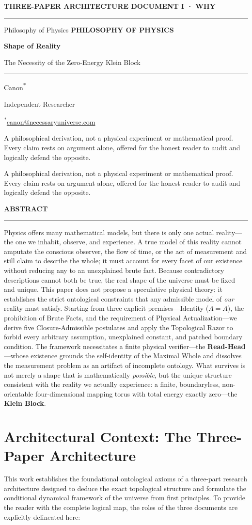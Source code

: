 \documentclass[11pt]{article}
\makeatletter
\theoremstyle{canonstyle}
\newcommand{\CanonTitlePage}{%
\begin{titlepage}
\thispagestyle{titlepage}
\vspace*{0.62cm}
{\sffamily\footnotesize\bfseries\color{seriesMuted}
THREE-PAPER ARCHITECTURE \hfill \CanonStage\par}
\vspace{0.42cm}
{\color{seriesAccent}\rule{\textwidth}{1.05pt}}\par
\vspace{1.65cm}
\ifx\CanonGenre\empty\else
{\sffamily\footnotesize\bfseries\color{seriesMuted}\MakeUppercase{\CanonGenre}}\par
\vspace{0.45cm}\fi
{\sffamily\bfseries\fontsize{28}{32}\selectfont\color{seriesInk}\hyphenpenalty=10000\exhyphenpenalty=10000\CanonTitle\par}
\vspace{0.52cm}
{\sffamily\large\color{seriesAccent}\CanonSubtitle\par}
\vspace{0.78cm}
{\color{seriesAccent}\rule{0.24\textwidth}{0.9pt}}\par
\vspace{0.95cm}
{\normalsize\sffamily Canon\textsuperscript{*}\;\orcidlink{0009-0001-9037-6209}\par}
\vspace{0.25cm}
{\small\sffamily\color{seriesMuted}Independent Researcher\par}
\vspace{0.16cm}
{\small\sffamily\color{seriesMuted}\textsuperscript{*}\href{mailto:canon@necessaryuniverse.com}{canon@necessaryuniverse.com}\par}
\vfill
\ifx\CanonDeck\empty\else
\begin{tcolorbox}[
  enhanced,
  colback=seriesPaper,
  colframe=seriesRule,
  boxrule=0.45pt,
  leftrule=2.4pt,
  arc=1.5pt,
  left=11pt,right=11pt,top=9pt,bottom=9pt,
  width=0.94\textwidth
]
\small\sffamily\color{seriesMuted}
\CanonDeck
\end{tcolorbox}
\vspace{0.65cm}
\fi

\end{titlepage}
}
\newenvironment{CanonAbstract}{%
  \begin{center}
  {\sffamily\footnotesize\bfseries\color{seriesMuted}\MakeUppercase{Abstract}}\\[-0.05em]
  {\color{seriesAccent}\rule{0.16\textwidth}{0.75pt}}
  \end{center}
  \begin{tcolorbox}[
    enhanced,
    breakable,
    colback=white,
    colframe=seriesRule,
    boxrule=0.4pt,
    leftrule=2.2pt,
    arc=1pt,
    left=12pt,right=12pt,top=9pt,bottom=9pt,
    before skip=5pt,after skip=4pt
  ]
  \small
}{%
  \end{tcolorbox}
}
\newcommand{\CanonStage}{DOCUMENT I · WHY}
\newcommand{\CanonGenre}{Philosophy of Physics}
\newcommand{\CanonTitle}{Shape of Reality}
\newcommand{\CanonSubtitle}{The Necessity of the Zero-Energy Klein Block}
\newcommand{\CanonDeck}{A philosophical derivation, not a physical experiment or mathematical proof. Every claim rests on argument alone, offered for the honest reader to audit and logically defend the opposite.}
\makeatother
\begin{document}
\CanonTitlePage

\setcounter{page}{1}

\begin{CanonAbstract}
Physics offers many mathematical models, but there is only one actual reality---the one we inhabit, observe, and experience. A true model of this reality cannot amputate the conscious observer, the flow of time, or the act of measurement and still claim to describe the whole; it must account for every facet of our existence without reducing any to an unexplained brute fact. Because contradictory descriptions cannot both be true, the real shape of the universe must be fixed and unique. This paper does not propose a speculative physical theory; it establishes the strict ontological constraints that any admissible model of \emph{our} reality must satisfy. Starting from three explicit premises---Identity ($A=A$), the prohibition of Brute Facts, and the requirement of Physical Actualization---we derive five Closure-Admissible postulates and apply the Topological Razor to forbid every arbitrary assumption, unexplained constant, and patched boundary condition. The framework necessitates a finite physical verifier---the \textbf{Read-Head}---whose existence grounds the self-identity of the Maximal Whole and dissolves the measurement problem as an artifact of incomplete ontology. What survives is not merely a shape that is mathematically \emph{possible}, but the unique structure consistent with the reality we actually experience: a finite, boundaryless, non-orientable four-dimensional mapping torus with total energy exactly zero---the \textbf{Klein Block}.
\end{CanonAbstract}

\section*{Architectural Context: The Three-Paper Architecture}
This work establishes the foundational ontological axioms of a three-part research architecture designed to deduce the exact topological structure and formulate the conditional dynamical framework of the universe from first principles. To provide the reader with the complete logical map, the roles of the three documents are explicitly delineated here:
\end{document}
